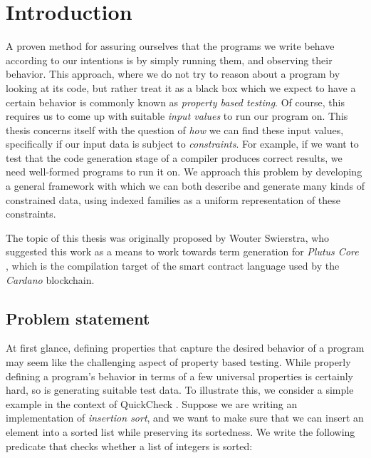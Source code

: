 \documentclass[a4paper,msc,twosized=semi]{uustthesis}
\let\oldemph\emph
\renewcommand\emph[1]{{\large\oldemph{#1}}}
\begin{document}
\mainmatter

\chapter{Introduction}\label{sec:introduction}
A proven method for assuring ourselves that the programs we write behave according to our intentions is by simply running them, and observing their behavior. This approach, where we do not try to reason about a program by looking at its code, but rather treat it as a black box which we expect to have a certain behavior is commonly known as \emph{property based testing}. Of course, this requires us to come up with suitable \emph{input values} to run our program on. This thesis concerns itself with the question of \emph{how} we can find these input values, specifically if our input data is subject to \emph{constraints}. For example, if we want to test that the code generation stage of a compiler produces correct results, we need well-formed programs to run it on. We approach this problem by developing a general framework with which we can both describe and generate many kinds of constrained data, using indexed families as a uniform representation of these constraints. 

The topic of this thesis was originally proposed by Wouter Swierstra, who suggested this work as a means to work towards term generation for \emph{Plutus Core} \cite{plutusspec2019}, which is the compilation target of the smart contract language used by the \emph{Cardano} \cite{cardano} blockchain.   

\section{Problem statement}

  At first glance, defining properties that capture the desired behavior of a program may seem like the challenging aspect of property based testing. While properly defining a program's behavior in terms of a few universal properties is certainly hard, so is generating suitable test data. To illustrate this, we consider a simple example in the context of QuickCheck \cite{claessen2011quickcheck}. Suppose we are writing an implementation of \emph{insertion sort}, and we want to make sure that we can insert an element into a sorted list while preserving its sortedness. We write the following predicate that checks whether a list of integers is sorted: 
\end{document}
